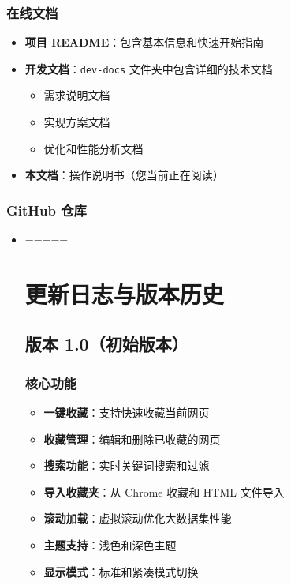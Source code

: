 \documentclass[10pt,a4paper]{article}
\begin{document}
\begin{itemize}
\begin{itemize}
\begin{itemize}
\begin{itemize}
\begin{enumerate}
\subsubsection{在线文档}
\begin{itemize}
  \item \textbf{项目 README}：包含基本信息和快速开始指南
  \item \textbf{开发文档}：\texttt{dev-docs} 文件夹中包含详细的技术文档
    \begin{itemize}
      \item 需求说明文档
      \item 实现方案文档
      \item 优化和性能分析文档
    \end{itemize}
  \item \textbf{本文档}：操作说明书（您当前正在阅读）
\end{itemize}

\subsubsection{GitHub 仓库}
\begin{itemize}
  \item {} =====
\section{更新日志与版本历史}

\subsection{版本 1.0（初始版本）}

\subsubsection{核心功能}
\begin{itemize}
  \item \textbf{一键收藏}：支持快速收藏当前网页
  \item \textbf{收藏管理}：编辑和删除已收藏的网页
  \item \textbf{搜索功能}：实时关键词搜索和过滤
  \item \textbf{导入收藏夹}：从 Chrome 收藏和 HTML 文件导入
  \item \textbf{滚动加载}：虚拟滚动优化大数据集性能
  \item \textbf{主题支持}：浅色和深色主题
  \item \textbf{显示模式}：标准和紧凑模式切换
\end{itemize}


\end{itemize}
\end{enumerate}
\end{itemize}
\end{itemize}
\end{itemize}
\end{itemize}
\end{document}
